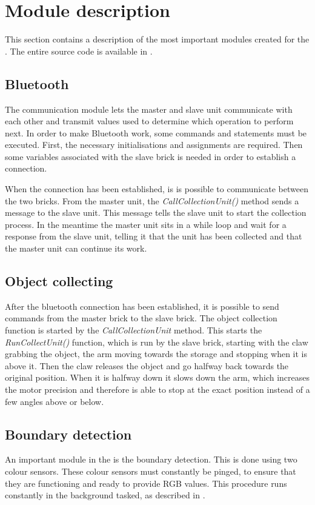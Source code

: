 \section{Module description} \label{sec:module-description}

This section contains a description of the most important modules created for the \projname{}. The entire source code is available in .

\subsection{Bluetooth}
The communication module lets the master and slave unit communicate with each other and transmit values used to determine which operation to perform next. In order to make Bluetooth work, some commands and statements must be executed. First, the necessary initialisations and assignments are required. Then some variables associated with the slave brick is needed in order to establish a connection.

When the connection has been established, is is possible to communicate between the two bricks. From the master unit, the \emph{CallCollectionUnit()} method sends a message to the slave unit. This message tells the slave unit to start the collection process. In the meantime the master unit sits in a while loop and wait for a response from the slave unit, telling it that the unit has been collected and that the master unit can continue its work.

\subsection{Object collecting}
After the bluetooth connection has been established, it is possible to send commands from the master brick to the slave brick. The object collection function is started by the \emph{CallCollectionUnit} method. This starts the \emph{RunCollectUnit()} function, which is run by the slave brick, starting with the claw grabbing the object, the arm moving towards the storage and stopping when it is above it. Then the claw releases the object and go halfway back towards the original position. When it is halfway down it slows down the arm, which increases the motor precision and therefore is able to stop at the exact position instead of a few angles above or below. 

\subsection{Boundary detection}
An important module in the \projname{} is the boundary detection. This is done using two colour sensors. These colour sensors must constantly be pinged, to ensure that they are functioning and ready to provide RGB values. This procedure runs constantly in the background tasked, as described in .

